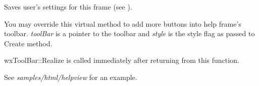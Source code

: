 \label{wxhtmlhelpframewritecustomization}


Saves user's settings for this frame (see ).

\label{wxhtmlhelpframeaddtoolbarbuttons}


You may override this virtual method to add more buttons into help frame's
toolbar. {\it toolBar} is a pointer to the toolbar and {\it style} is the style
flag as passed to Create method.

wxToolBar::Realize is called immediately after returning from this function.

See {\it samples/html/helpview} for an example.

